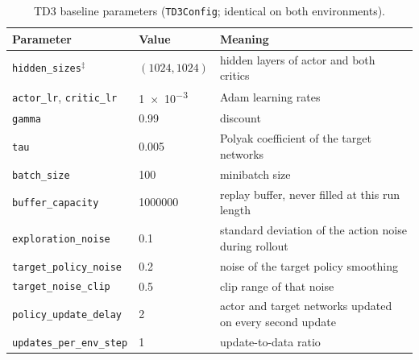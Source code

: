 \begin{table}[tbp]
  \centering
  \footnotesize
  \caption{TD3 baseline parameters (\texttt{TD3Config}; identical on both environments).}
  \label{tab:app-hp-td3}
  \begin{tabular}{@{}p{4.7cm}p{3.7cm}p{5.0cm}@{}}
    \toprule
    Parameter                                                   & Value                         & Meaning                                              \\
    \midrule
    \texttt{hidden\_sizes}$^{\ddagger}$                         & $(1024,1024)$                 & hidden layers of actor and both critics              \\
    \texttt{actor\_lr}, \texttt{critic\_lr}                     & \num{1e-3}                    & Adam learning rates                                  \\
    \texttt{gamma}                                              & \num{0.99}                    & discount                                             \\
    \texttt{tau}                                                & \num{0.005}                   & Polyak coefficient of the target networks            \\
    \texttt{batch\_size}                                        & \num{100}                     & minibatch size                                       \\
    \texttt{buffer\_capacity}                                   & \num{1000000}                 & replay buffer, never filled at this run length       \\
    \texttt{exploration\_noise}                                 & \num{0.1}                     & standard deviation of the action noise during rollout \\
    \texttt{target\_policy\_noise}                              & \num{0.2}                     & noise of the target policy smoothing                 \\
    \texttt{target\_noise\_clip}                                & \num{0.5}                     & clip range of that noise                             \\
    \texttt{policy\_update\_delay}                              & \num{2}                       & actor and target networks updated on every second update \\
    \texttt{updates\_per\_env\_step}                            & \num{1}                       & update-to-data ratio                                 \\
    \bottomrule
  \end{tabular}
\end{table}

